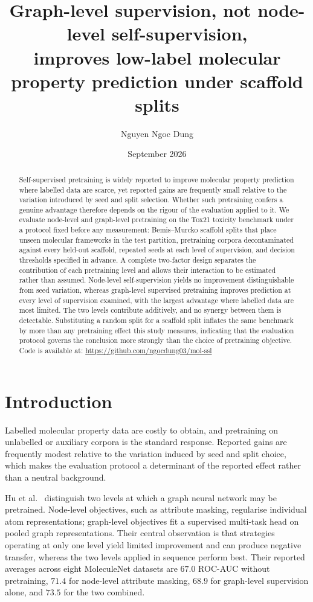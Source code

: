 \documentclass[11pt,a4paper]{article}
\title{\large Graph-level supervision, not node-level self-supervision,\\
improves low-label molecular property prediction under scaffold splits}
\author{Nguyen Ngoc Dung}
\date{September 2026}
\begin{document}
\maketitle

\begin{abstract}
\noindent
Self-supervised pretraining is widely reported to improve molecular property
prediction where labelled data are scarce, yet reported gains are frequently
small relative to the variation introduced by seed and split selection. Whether
such pretraining confers a genuine advantage therefore depends on the rigour of
the evaluation applied to it. We evaluate node-level and graph-level pretraining
on the Tox21 toxicity benchmark under a protocol fixed before any measurement:
Bemis--Murcko scaffold splits that place unseen molecular frameworks in the test
partition, pretraining corpora decontaminated against every held-out scaffold,
repeated seeds at each level of supervision, and decision thresholds specified
in advance. A complete two-factor design separates the contribution of each
pretraining level and allows their interaction to be estimated rather than
assumed. Node-level self-supervision yields no improvement distinguishable from
seed variation, whereas graph-level supervised pretraining improves prediction
at every level of supervision examined, with the largest advantage where
labelled data are most limited. The two levels contribute additively, and no
synergy between them is detectable. Substituting a random split for a scaffold
split inflates the same benchmark by more than any pretraining effect this study
measures, indicating that the evaluation protocol governs the conclusion more
strongly than the choice of pretraining objective. Code is available at:
\url{https://github.com/ngocdung03/mol-ssl}
\end{abstract}

\section{Introduction}

Labelled molecular property data are costly to obtain, and pretraining on
unlabelled or auxiliary corpora is the standard response. Reported gains are
frequently modest relative to the variation induced by seed and split choice,
which makes the evaluation protocol a determinant of the reported effect rather
than a neutral background.

Hu et al.~\cite{hu2020} distinguish two levels at which a graph neural network
may be pretrained. Node-level objectives, such as attribute masking, regularise
individual atom representations; graph-level objectives fit a supervised
multi-task head on pooled graph representations. Their central observation is
that strategies operating at only one level yield limited improvement and can
produce negative transfer, whereas the two levels applied in sequence perform
best. Their reported averages across eight MoleculeNet datasets are $67.0$
ROC-AUC without pretraining, $71.4$ for node-level attribute masking, $68.9$ for
graph-level supervision alone, and $73.5$ for the two combined.
\end{document}
